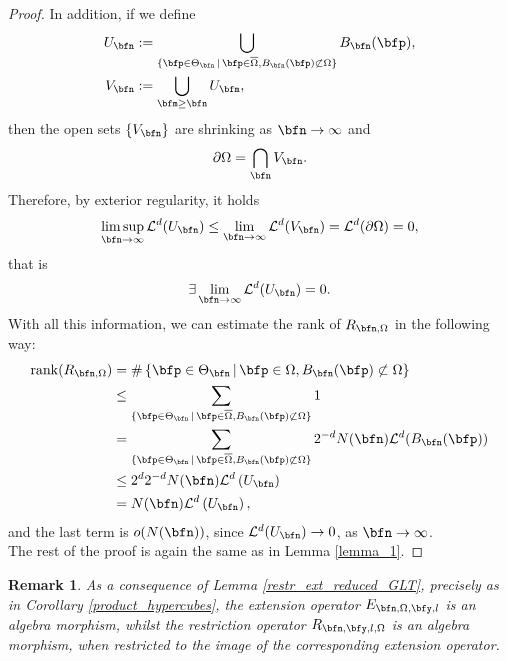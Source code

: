 \documentclass{amsart}
\newtheorem{rem}[thm]{Remark}
\begin{document}
\begin{proof}
    In addition, if we define 
    \begin{align*}
        U_\bfn&:=\bigcup\limits_{\{\bfp\in\Theta_\bfn\,\vert\,\bfp\in\overline{\Omega},B_\bfn(\bfp)\not\subset\Omega\}} B_\bfn(\bfp),\\
        V_\bfn&:=\bigcup\limits_{\bfm\geq\bfn}U_\bfm,
    \end{align*}
    then the open sets $\{V_\bfn\}$ are shrinking as $\bfn\to\infty$ and 
    \begin{equation*}
        \partial\Omega=\bigcap_\bfn V_\bfn.
    \end{equation*}
    Therefore, by exterior regularity, it holds
    \begin{equation*}
        \limsup\limits_{\bfn\to\infty}\mathcal{L}^d(U_\bfn)\leq\lim\limits_{\bfn\to\infty}\mathcal{L}^d(V_\bfn)=\mathcal{L}^d(\partial\Omega)=0,
    \end{equation*}
    that is 
    \begin{equation*}
        \exists\lim\limits_{\bfn\to\infty}\mathcal{L}^d(U_\bfn)=0.
    \end{equation*}
    With all this information, we can estimate the rank of $R_{\bfn,\Omega}$ in the following way:
    \begin{align*}
        \mathrm{rank}(R_{\bfn,\Omega})&=\#\left\{\bfp\in\Theta_\bfn\,\vert\,\bfp\in\Omega,B_\bfn(\bfp)\not\subset\Omega\right\}\\
        &\leq\sum\limits_{\{\bfp\in\Theta_\bfn\,\vert\,\bfp\in\overline{\Omega},B_\bfn(\bfp)\not\subset\Omega\}}1\\
        &=\sum\limits_{\{\bfp\in\Theta_\bfn\,\vert\,\bfp\in\overline{\Omega},B_\bfn(\bfp)\not\subset\Omega\}}2^{-d}N(\bfn)\mathcal{L}^d(B_\bfn(\bfp))\\
        &\leq 2^d2^{-d}N(\bfn)\mathcal{L}^d\left(U_\bfn\right)\\
        &=N(\bfn)\mathcal{L}^d\left(U_\bfn\right),
    \end{align*}
    and the last term is $o(N(\bfn))$, since $\mathcal{L}^d(U_\bfn)\to0$, as $\bfn\to\infty$.\\ The rest of the proof is again the same as in Lemma \ref{lemma_1}.
\end{proof}

\begin{rem}
    As a consequence of Lemma \ref{restr_ext_reduced_GLT}, precisely as in Corollary \ref{product_hypercubes}, the extension operator $E_{\bfn,\Omega,\bfy,l}$ is an algebra morphism, whilst the restriction operator $R_{\bfn,\bfy,l,\Omega}$ is an algebra morphism, when restricted to the image of the corresponding extension operator.
\end{rem}
\end{document}
